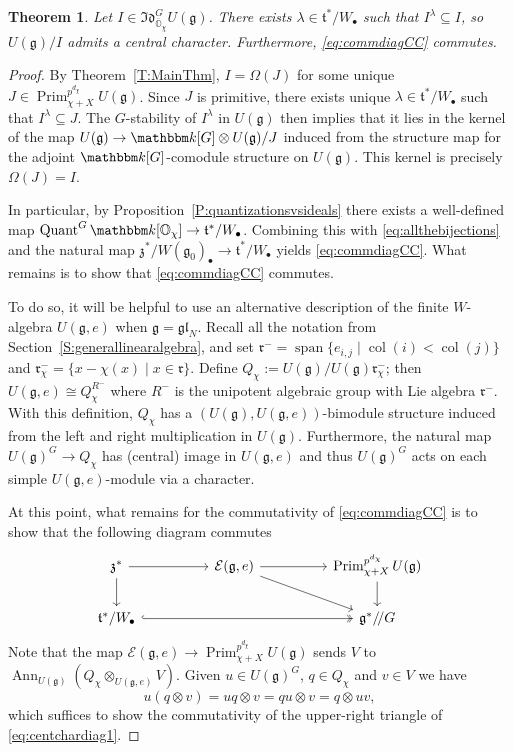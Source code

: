 \documentclass[twoside,12pt,reqno]{amsart}
\newtheorem{Theorem}{Theorem}[section]
\theoremstyle{remark}
\numberwithin{equation}{section}
\def\k{{\mathbbm k}}
\def\Ann{\operatorname{Ann}}
\def\col{\operatorname{col}}
\def\sspan{\operatorname{span}}
\def\Quant{\operatorname{Quant}}
\def\Prim{\operatorname{Prim}}
\def\col{\operatorname{col}}
\def\O{{\mathbb O}}
\def\cO{{\overline{\mathbb O}}}
\def\g{{\mathfrak g}}
\def\gl{\mathfrak{gl}}
\def\t{\mathfrak t}
\def\r{\mathfrak{r}}
\def\z{\mathfrak{z}}
\def\Idl{\mathfrak{Id}}
\def\E{\mathcal{E}}
\begin{document}
\begin{Theorem}
\label{C:quantshavecharacters}
    Let $I\in\Idl_{\cO_\chi}^G U(\g)$. There exists $\lambda\in\t^*/W_\bullet$ such that $I^\lambda\subseteq I$, so $U(\g) / I$ admits a central character. Furthermore, \eqref{eq:commdiagCC} commutes. 
\end{Theorem}

\begin{proof}
    By Theorem~\ref{T:MainThm}, $I=\Omega(J)$ for some unique $J\in\Prim_{\chi+X}^{p^{d_\chi}} U(\g)$. Since $J$ is primitive, there exists unique $\lambda\in \t^*/W_\bullet$ such that $I^\lambda\subseteq J$. The $G$-stability of $I^\lambda$ in $U(\g)$ then implies that it lies in the kernel of the map $U(\g)\to\k[G]\otimes U(\g)/J$ induced from the structure map for the adjoint $\k[G]$-comodule structure on $U(\g)$. This kernel is precisely $\Omega(J)=I$.

    In particular, by Proposition~\ref{P:quantizationsvsideals} there exists a well-defined map $\Quant^G\k[\O_\chi]\to\t^*/W_\bullet$. Combining this with \eqref{eq:allthebijections} and the natural map $\z^*/W(\g_0)_\bullet\to \t^*/W_\bullet$ yields \eqref{eq:commdiagCC}. What remains is to show that \eqref{eq:commdiagCC} commutes.
    
    To do so, it will be helpful to use an alternative description of the finite $W$-algebra $U(\g,e)$ when $\g=\gl_N$. Recall all the notation from Section~\ref{S:generallinearalgebra}, and set $\r^{-}=\sspan\{e_{i,j} \mid \col(i) < \col(j)\}$ and $\r^-_\chi=\{x-\chi(x)\mid x\in\r\}$. Define $Q_\chi:=U(\g)/U(\g)\r^-_\chi$; then $U(\g,e)\cong Q_\chi^{R^{-}}$ where $R^{-}$ is the unipotent algebraic group with Lie algebra $\r^-$. With this definition, $Q_\chi$ has a $(U(\g),U(\g,e))$-bimodule structure induced from the left and right multiplication in $U(\g)$. Furthermore,  the natural map $U(\g)^G\to Q_\chi$ has (central) image in $U(\g,e)$ and thus $U(\g)^G$ acts on each simple $U(\g,e)$-module via a character.
    
    At this point, what remains for the commutativity of \eqref{eq:commdiagCC} is to show that the following diagram commutes
\begin{eqnarray}
\label{eq:centchardiag1}
\begin{tikzcd}
\z^*\arrow[rr]   \arrow[d] & & \E(\g,e) \arrow[rr] \arrow[rrd]& &  \Prim_{\chi+X}^{p^{d_\chi}} U(\g)  \arrow[d]\\
\t^*/W_\bullet \arrow[rrrr, hook, two heads] & & &   & \g^*/\!/G
\end{tikzcd}
\end{eqnarray}
Note that the map $\E(\g,e)\to \Prim_{\chi+X}^{p^{d_\chi}} U(\g)$ sends $V$ to $\Ann_{U(\g)} (Q_\chi \otimes_{U(\g,e)}V)$. Given $u\in U(\g)^G$, $q\in Q_\chi$ and $v\in V$ we have $$u(q\otimes v)=uq\otimes v=qu\otimes v = q\otimes uv,$$ which suffices to show the commutativity of the upper-right triangle of \eqref{eq:centchardiag1}.


\end{proof}
\end{document}
